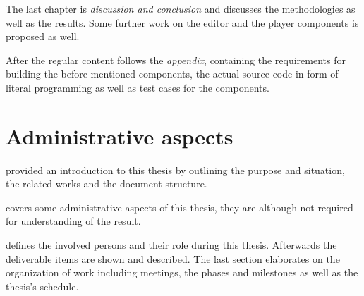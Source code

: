 \documentclass[%
    a4paper,    %
    justified,  %
    nobib,      %
    openany     %
]{tufte-book}
\begin{document}
The last chapter is \textit{discussion and conclusion} and discusses the
methodologies as well as the results. Some further work on the editor and the
player components is proposed as well.

After the regular content follows the \textit{appendix}, containing the
requirements for building the before mentioned components, the actual source
code in form of literal programming as well as test cases for the components.

\chapter{Administrative aspects}
\label{chap:administrative_aspects}

 provided an introduction to this thesis by
outlining the purpose and situation, the related works and the document
structure.

 covers some administrative aspects of this thesis,
they are although not required for understanding of the result.

 defines the involved persons and their role
during this thesis. Afterwards the deliverable items are shown and described.
The last section elaborates on the organization of work including meetings, the
phases and milestones as well as the thesis's schedule.
\end{document}
